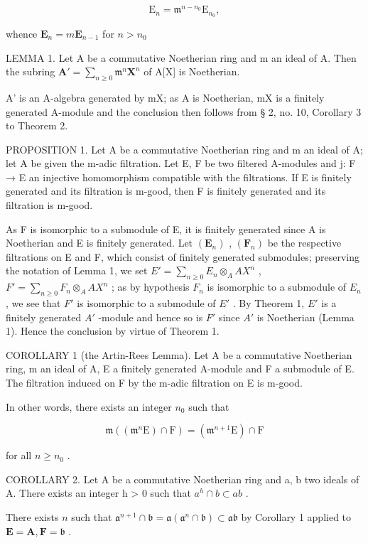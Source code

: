 \[
\mathrm{E} _ {n} = \mathfrak {m} ^ {n - n _ {0}} \mathrm{E} _ {n _ {0}},
\]

whence \(\mathbf{E}_n = m\mathbf{E}_{n - 1}\) for \(n > n_0\)

LEMMA 1. Let A be a commutative Noetherian ring and m an ideal of A. Then the subring \(\mathbf{A}' = \sum_{n\geqslant 0}\mathfrak{m}^n\mathbf{X}^n\) of A{[}X{]} is Noetherian.

A' is an A-algebra generated by mX; as A is Noetherian, mX is a finitely generated A-module and the conclusion then follows from § 2, no. 10, Corollary 3 to Theorem 2.

PROPOSITION 1. Let A be a commutative Noetherian ring and m an ideal of A; let A be given the m-adic filtration. Let E, F be two filtered A-modules and j: F → E an injective homomorphism compatible with the filtrations. If E is finitely generated and its filtration is m-good, then F is finitely generated and its filtration is m-good.

As F is isomorphic to a submodule of E, it is finitely generated since A is Noetherian and E is finitely generated. Let \((\mathbf{E}_{n})\) , \((\mathbf{F}_{n})\) be the respective filtrations on E and F, which consist of finitely generated submodules; preserving the notation of Lemma 1, we set \(E' = \sum_{n \geqslant 0} E_{n} \otimes_{A} AX^{n}\) , \(F' = \sum_{n \geqslant 0} F_{n} \otimes_{A} AX^{n}\) ; as by hypothesis \(F_{n}\) is isomorphic to a submodule of \(E_{n}\) , we see that \(F'\) is isomorphic to a submodule of \(E'\) . By Theorem 1, \(E'\) is a finitely generated \(A'\) -module and hence so is \(F'\) since \(A'\) is Noetherian (Lemma 1). Hence the conclusion by virtue of Theorem 1.

COROLLARY 1 (the Artin-Rees Lemma). Let A be a commutative Noetherian ring, m an ideal of A, E a finitely generated A-module and F a submodule of E. The filtration induced on F by the m-adic filtration on E is m-good.

In other words, there exists an integer \(n_{0}\) such that

\[
\mathfrak {m} ((\mathfrak {m} ^ {n} \mathrm{E}) \cap \mathrm{F}) = (\mathfrak {m} ^ {n + 1} \mathrm{E}) \cap \mathrm{F}\tag{1}
\]

for all \(n \geqslant n_0\) .

COROLLARY 2. Let A be a commutative Noetherian ring and a, b two ideals of A. There exists an integer h \textgreater{} 0 such that \(a^{h} \cap b \subset ab\) .

There exists \(n\) such that \(\mathfrak{a}^{n+1} \cap \mathfrak{b} = \mathfrak{a}(\mathfrak{a}^n \cap \mathfrak{b}) \subset \mathfrak{ab}\) by Corollary 1 applied to \(\mathbf{E} = \mathbf{A}, \mathbf{F} = \mathfrak{b}\) .

